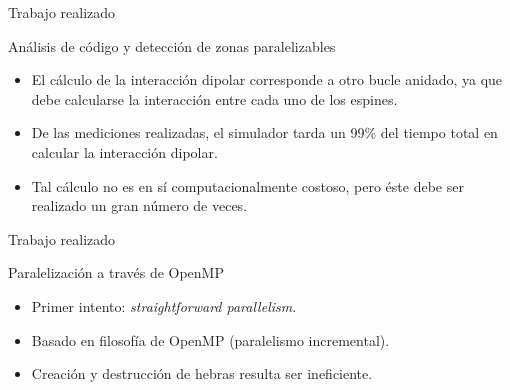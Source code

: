 \begin{frame}{Trabajo realizado}
\begin{block}{Análisis de código y detección de zonas paralelizables}
\begin{itemize}
  \item El cálculo de la interacción dipolar corresponde a otro bucle anidado, ya que debe calcularse la interacción entre cada uno de los espines.
  \item De las mediciones realizadas, el simulador tarda un 99\% del tiempo total en calcular la interacción dipolar.
  \item Tal cálculo no es en sí computacionalmente costoso, pero éste debe ser realizado un gran número de veces.
\end{itemize}
\centerline{
      }
\end{block}

\end{frame}
\begin{frame}{Trabajo realizado}
\begin{block}{Paralelización a través de OpenMP}
\begin{itemize}
  \item Primer intento: \textit{straightforward parallelism}.
  \item Basado en filosofía de OpenMP (paralelismo incremental).
  \item Creación y destrucción de hebras resulta ser ineficiente.
\end{itemize}
\end{block}
\end{frame}


